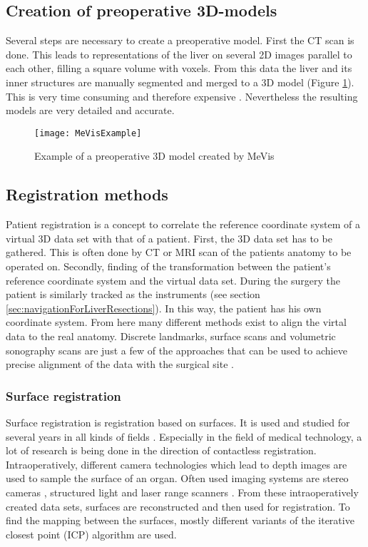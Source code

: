 \subsection{Creation of preoperative 3D-models}
Several steps are necessary to create a preoperative model. First the 
CT scan is done. This leads to representations of the liver on several 2D images parallel
to each other, filling a square volume with voxels. From this data the liver and
its inner structures are manually segmented and merged to a 3D model (Figure \ref{fig:MeVisExample}). This is very
time consuming and therefore expensive \cite{numminen2005preoperative}.
Nevertheless the resulting models are very detailed and accurate.
\begin{figure}[H]
  \centering
 \texttt{[image: MeVisExample]}
 \caption{Example of a preoperative 3D model created by MeVis}%
  \label{fig:MeVisExample}
\end{figure}

\subsection{Registration methods}
Patient registration is a concept to correlate the reference coordinate system
of a virtual 3D data set with that of a patient. First, the 3D data set has to
be gathered. This is often done by CT or MRI scan of the patients anatomy to be
operated on. Secondly, finding of the transformation between the patient's
reference coordinate system and the virtual data set. During the surgery the patient is similarly
tracked as the instruments (see section \ref{sec:navigationForLiverResections}).
In this way, the patient has his own coordinate system. From here many different
methods exist to align the virtal data to the real anatomy.
Discrete landmarks, surface scans and
volumetric sonography scans are just a few of the approaches that can be
used to achieve precise alignment of the data with the
surgical site \cite{banz2016intraoperative}. 

\subsubsection{Surface registration}
Surface registration is registration based on surfaces. It is used and studied
for several years in all kinds of fields \cite{ramos2015review}. Especially in
the field of medical technology, a lot of research is being done in the
direction of contactless registration. Intraoperatively, different camera technologies which lead
to depth images are used to sample the surface of an organ. Often used imaging systems are stereo cameras
\cite{furukawa2010accurate}, structured light \cite{salvi2004pattern} and
laser range scanners \cite{cash2003incorporation}. From these intraoperatively
created data sets, surfaces are reconstructed and then used for registration. To
find the mapping between the surfaces, mostly different variants of the iterative
closest point (ICP) \cite{besl1992method} algorithm are used. 

